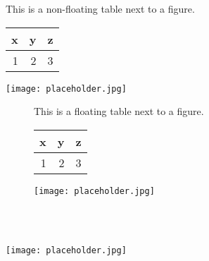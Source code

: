 \documentclass[10pt,oneside]{book}
\begin{document}
\noindent
\begin{minipage}{\textwidth}
  This is a non-floating table next to a figure.

\flushleft
\begin{minipage}{.48\linewidth}
  \centering
  \label{tab:tableexample3}
  \begin{tabular}{rrr}
    \toprule
    x & y & z \\
    \midrule
    1 & 2 & 3 \\
    \bottomrule
  \end{tabular}
\end{minipage}
\quad
\begin{minipage}{.48\linewidth}
  \centering
  \texttt{[image: placeholder.jpg]}
  \label{fig:graph1}
\end{minipage}%
\end{minipage}



\begin{figure}
  This is a floating table next to a figure.

\flushleft
\begin{minipage}{.48\linewidth}
  \centering
  \label{tab:tableexample4}
  \begin{tabular}{rrr}
    \toprule
    x & y & z \\
    \midrule
    1 & 2 & 3 \\
    \bottomrule
  \end{tabular}
\end{minipage}
\quad
\begin{minipage}{.48\linewidth}
  \centering
  \texttt{[image: placeholder.jpg]}
  \label{fig:graph1}
\end{minipage}%
\end{figure}



\begin{widefigure}
  \begin{minipage}[t]{0.25\linewidth}
    \mbox{}\\
    \label{fig:blah}
  \end{minipage}
  \hfill
  \begin{minipage}[t]{0.715\linewidth}
    \mbox{}\\
    \texttt{[image: placeholder.jpg]}
  \end{minipage}
\end{widefigure}
\end{document}
